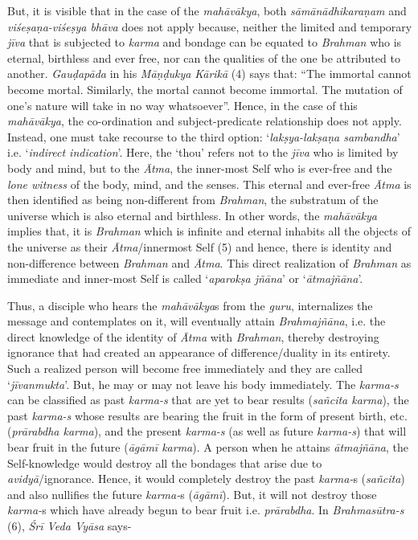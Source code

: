 But, it is visible that in the case of the \emph{mahāvākya}, both \emph{sāmānādhi\-karaṇam} and \emph{viśeṣaṇa-viśeṣya bhāva} does not apply because, neither the limited and temporary \emph{jīva} that is subjected to \emph{karma} and bondage can be equated to \emph{Brahman} who is eternal, birthless and ever free, nor can the qualities of the one be attributed to another. \emph{Gauḍapāda} in his \emph{Māṇḍukya} \emph{Kārikā} (4) says that: ``The immortal cannot become mortal. Similarly, the mortal cannot become immortal. The mutation of one's nature will take in no way whatsoever''. Hence, in the case of this \emph{mahāvākya}, the co-ordination and subject-predicate relationship does not apply. Instead, one must take recourse to the third option: `\emph{lakṣya-lakṣaṇa sambandha}' i.e. `\emph{indirect indication}'. Here, the `thou' refers not to the \emph{jīva} who is limited by body and mind, but to the \emph{Ātma}, the inner-most Self who is ever-free and the \emph{lone witness} of the body, mind, and the senses. This eternal and ever-free \emph{Ātma} is then identified as being non-different from \emph{Brahman}, the substratum of the universe which is also eternal and birthless. In other words, the \emph{mahāvākya} implies that, it is \emph{Brahman} which is infinite and eternal inhabits all the objects of the universe as their \emph{Ātma}/innermost Self (5) and hence, there is identity and non-difference between \emph{Brahman} and \emph{Ātma}. This direct realization of \emph{Brahman} as immediate and inner-most Self is called `\emph{aparokṣa jñāna}' or `\emph{ātmajñāna}'.

Thus, a disciple who hears the \emph{mahāvākya}s from the \emph{guru}, internalizes the message and contemplates on it, will eventually attain \emph{Brahmajñāna}, i.e. the direct knowledge of the identity of \emph{Ātma} with \emph{Brahman}, thereby destroying ignorance that had created an appearance of difference/duality in its entirety. Such a realized person will become free immediately and they are called `\emph{jīvanmukta}'. But, he may or may not leave his body immediately. The \emph{karma-s} can be classified as past \emph{karma-s} that are yet to bear results (\emph{sañcita karma}), the past \emph{karma-s} whose results are bearing the fruit in the form of present birth, etc. (\emph{prārabdha karma}), and the present \emph{karma-s} (as well as future \emph{karma-s}) that will bear fruit in the future (\emph{āgāmī karma}). A person when he attains \emph{ātmajñāna}, the Self-knowledge would destroy all the bondages that arise due to \emph{avidyā}/ignorance. Hence, it would completely destroy the past \emph{karma-}s (\emph{sañcita}) and also nullifies the future \emph{karma-}s (\emph{āgāmī}). But, it will not destroy those \emph{karma-}s which have already begun to bear fruit i.e. \emph{prārabdha}. In \emph{Brahmasūtra-s} (6), \emph{Śrī Veda Vyāsa} says-

